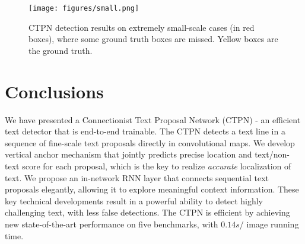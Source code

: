 \documentclass[runningheads]{llncs}
\begin{document}
\begin{figure}[tb]
\centering
\texttt{[image: figures/small.png]}
\caption{CTPN detection results on extremely small-scale cases (in red boxes), where some ground truth boxes are missed. Yellow boxes are the ground truth. }
\label{fig:samll}
\end{figure}


\section{Conclusions}

We have presented a Connectionist Text Proposal Network (CTPN) - an efficient text detector that is end-to-end trainable. The CTPN detects a text line in a sequence of fine-scale text proposals directly in convolutional maps. We develop vertical anchor mechanism that jointly predicts precise location and text/non-text score for each proposal, which is the key to realize \textit{accurate} localization of text. 
We propose an in-network RNN layer that connects sequential text proposals elegantly, allowing it to explore meaningful context information. These key technical developments result in a powerful ability to detect highly challenging text, with less false detections. The CTPN is efficient by achieving new state-of-the-art performance on five benchmarks, with $0.14s$/ image running time.


\clearpage



\end{document}
